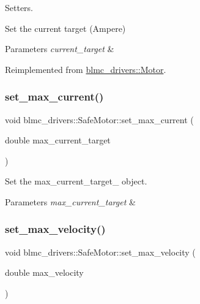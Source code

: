 Setters. 

Set the current target (Ampere)


\begin{DoxyParams}{Parameters}
{\em current\+\_\+target} & \\
\hline
\end{DoxyParams}


Reimplemented from \hyperlink{classblmc__drivers_1_1Motor_a48801c9858a7b1784b0a0ac4272fdaf5}{blmc\+\_\+drivers\+::\+Motor}.

\mbox{\label{classblmc__drivers_1_1SafeMotor_ad4f4bb531e2a9e7f965b319afb53d43c}} 
\subsubsection{\texorpdfstring{set\+\_\+max\+\_\+current()}{set\_max\_current()}}
{\footnotesize\ttfamily void blmc\+\_\+drivers\+::\+Safe\+Motor\+::set\+\_\+max\+\_\+current (\begin{DoxyParamCaption}\item[{double}]{max\+\_\+current\+\_\+target }\end{DoxyParamCaption})\hspace{0.3cm}{\ttfamily [inline]}}



Set the max\+\_\+current\+\_\+target\+\_\+ object. 


\begin{DoxyParams}{Parameters}
{\em max\+\_\+current\+\_\+target} & \\
\hline
\end{DoxyParams}
\mbox{\label{classblmc__drivers_1_1SafeMotor_aaa0083a39d815d7b3cd38c680bfea48a}} 
\subsubsection{\texorpdfstring{set\+\_\+max\+\_\+velocity()}{set\_max\_velocity()}}
{\footnotesize\ttfamily void blmc\+\_\+drivers\+::\+Safe\+Motor\+::set\+\_\+max\+\_\+velocity (\begin{DoxyParamCaption}\item[{double}]{max\+\_\+velocity }\end{DoxyParamCaption})\hspace{0.3cm}{\ttfamily [inline]}}



